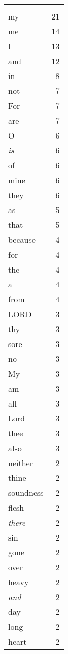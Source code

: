 \begin{center}
\begin{longtable}{l|r}
\hline \multicolumn{2}{c}{{ }} \\ \hline
\endfoot 
my & 21\\ \hline 
me & 14\\ \hline 
I & 13\\ \hline 
and & 12\\ \hline 
in & 8\\ \hline 
not & 7\\ \hline 
For & 7\\ \hline 
are & 7\\ \hline 
O & 6\\ \hline 
\emph{is} & 6\\ \hline 
of & 6\\ \hline 
mine & 6\\ \hline 
they & 6\\ \hline 
as & 5\\ \hline 
that & 5\\ \hline 
because & 4\\ \hline 
for & 4\\ \hline 
the & 4\\ \hline 
a & 4\\ \hline 
from & 4\\ \hline 
LORD & 3\\ \hline 
thy & 3\\ \hline 
sore & 3\\ \hline 
no & 3\\ \hline 
My & 3\\ \hline 
am & 3\\ \hline 
all & 3\\ \hline 
Lord & 3\\ \hline 
thee & 3\\ \hline 
also & 3\\ \hline 
neither & 2\\ \hline 
thine & 2\\ \hline 
soundness & 2\\ \hline 
flesh & 2\\ \hline 
\emph{there} & 2\\ \hline 
sin & 2\\ \hline 
gone & 2\\ \hline 
over & 2\\ \hline 
heavy & 2\\ \hline 
\emph{and} & 2\\ \hline 
day & 2\\ \hline 
long & 2\\ \hline 
heart & 2\\ \hline 

\end{longtable}
\end{center}
